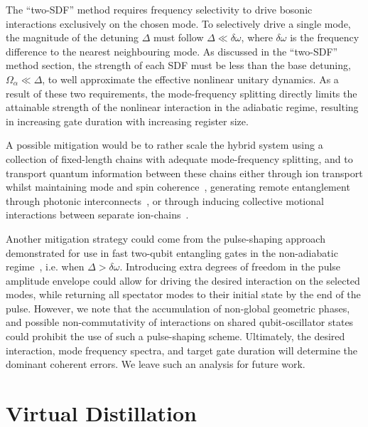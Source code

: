     The ``two-SDF'' method requires frequency selectivity to drive bosonic
    interactions exclusively on the chosen mode. 
    To selectively drive a single mode, the magnitude of the detuning $\Delta$ must follow $\Delta \ll \delta\omega$, where $\delta\omega$ is the frequency difference to the nearest neighbouring mode. As discussed in the ``two-SDF'' method section, the strength of each SDF must be less than the base detuning, $\Omega_\alpha \ll \Delta$, to well approximate the effective nonlinear unitary dynamics. As a result of these two requirements, the
    mode-frequency splitting directly limits the attainable strength of the nonlinear interaction in the adiabatic regime, resulting in increasing gate duration with increasing register size.

    A possible mitigation
    would be to rather scale the hybrid system using a collection of fixed-length
    chains with adequate mode-frequency splitting, and to transport quantum
    information between these chains either through ion transport whilst maintaining mode and spin coherence~\cite{walther_controlling_2012}, generating remote entanglement through photonic interconnects~\cite{luo_protocols_2009}, or through inducing collective motional interactions
    between separate ion-chains~\cite{valentini_demonstration_2025}. 

    Another
    mitigation strategy could come from the pulse-shaping approach demonstrated
    for use in fast two-qubit entangling gates in the non-adiabatic
    regime~\cite{schafer_fast_2018}, i.e. when $\Delta > \delta\omega$.
    Introducing extra degrees of freedom in the pulse amplitude envelope could allow for
    driving the desired interaction on the selected modes, while returning all spectator modes to their initial state by the end of the pulse. However, we note that the accumulation of
    non-global geometric phases, and possible non-commutativity of interactions
    on shared qubit-oscillator states could prohibit the use of such a
    pulse-shaping scheme. Ultimately, the desired interaction, mode frequency spectra, and target gate duration will determine the dominant coherent errors. We leave such an analysis for future work. 



\section{\textbf{Virtual Distillation}}
\label{sec:virtual_distillation}

